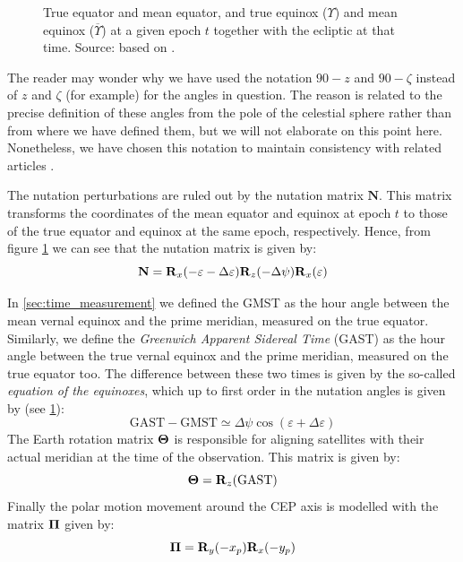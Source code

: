 \documentclass[../main.tex]{subfiles}
\begin{document}
\begin{figure}[htbp]
\begin{minipage}[ht]{0.45\textwidth}
    \caption{True equator and mean equator, and true equinox ($\Upsilon$) and mean equinox ($\overline\Upsilon$) at a given epoch $t$ together with the ecliptic at that time. Source: based on \cite{montenbruck}.}
    \label{fig:nutation_matrix}
  \end{minipage}
\end{figure}
The reader may wonder why we have used the notation $90-z$ and $90-\zeta$ instead of $z$ and $\zeta$ (for example) for the angles in question. The reason is related to the precise definition of these angles from the pole of the celestial sphere rather than from where we have defined them, but we will not elaborate on this point here. Nonetheless, we have chosen this notation to maintain consistency with related articles \cite{lieske}.

The nutation perturbations are ruled out by the nutation matrix $\mathbf{N}$. This matrix transforms the coordinates of the mean equator and equinox at epoch $t$ to those of the true equator and equinox at the same epoch, respectively. Hence, from figure \cref{fig:nutation_matrix} we can see that the nutation matrix is given by:
\begin{equation}
  \mathbf{N}=\boldsymbol{\mathrm{R}}_x(-\varepsilon-\Delta \varepsilon)\boldsymbol{\mathrm{R}}_z(-\Delta \psi)\boldsymbol{\mathrm{R}}_x(\varepsilon)
\end{equation}

In \cref{sec:time_measurement} we defined the GMST as the hour angle between the mean vernal equinox and the prime meridian, measured on the true equator. Similarly, we define the \emph{Greenwich Apparent Sidereal Time} (GAST) as the hour angle between the true vernal equinox and the prime meridian, measured on the true equator too. The difference between these two times is given by the so-called \emph{equation of the equinoxes}, which up to first order in the nutation angles is given by (see \cref{fig:nutation_matrix}):
\begin{equation}
  \text{GAST}- \text{GMST}\simeq\Delta \psi\cos(\varepsilon+\Delta \varepsilon)
\end{equation}
The Earth rotation matrix $\boldsymbol{\mathrm{\Theta}}$ is responsible for aligning satellites with their actual meridian at the time of the observation. This matrix is given by:
\begin{equation}
  \boldsymbol{\mathrm{\Theta}}=\boldsymbol{\mathrm{R}}_z(\text{GAST})
\end{equation}
Finally the polar motion movement around the CEP axis is modelled with the matrix $\boldsymbol{\mathrm{\Pi}}$ given by:
\begin{equation}
  \boldsymbol{\mathrm{\Pi}}=\boldsymbol{\mathrm{R}}_y(- x_p)\boldsymbol{\mathrm{R}}_x(- y_p)
\end{equation}
\end{document}
